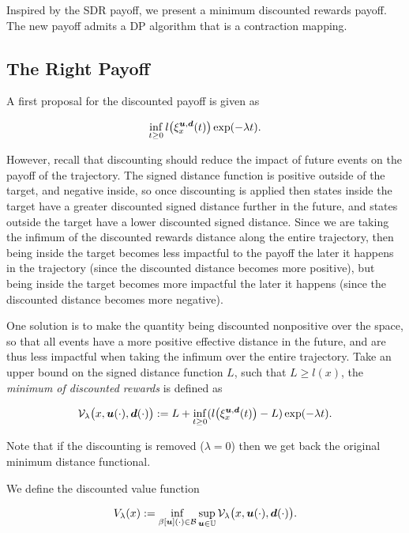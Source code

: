 Inspired by the SDR payoff, we present a minimum discounted rewards payoff. The new payoff admits a DP algorithm that is a contraction mapping.

\subsection{The Right Payoff}

A first proposal for the discounted payoff is given as 
 
\begin{equation}\label{eq:V}
\inf_{t\ge 0}l\big(\xi_{x}^{\bm{u},\bm{d}}(t)\big)\exp(-\lambda  t).
\end{equation}

However, recall that discounting should reduce the impact of future events on the payoff of the trajectory. The signed distance function is positive outside of the target, and negative inside, so once discounting is applied then states inside the target have a greater discounted signed distance further in the future, and states outside the target have a lower discounted signed distance. Since we are taking the infimum of the discounted rewards distance along the entire trajectory, then being inside the target becomes less impactful to the payoff the later it happens in the trajectory (since the discounted distance becomes more positive), but being inside the target becomes more impactful the later it happens (since the discounted distance becomes more negative).

One solution is to make the quantity being discounted nonpositive over the space, so that all events have a more positive effective distance in the future, and are thus less impactful when taking the infimum over the entire trajectory. Take an upper bound on the signed distance function $L$, such that $L\geq l(x)$, the \emph{minimum of discounted rewards} is defined as 

\begin{equation}\label{eq:V_lambda}
\mathcal{V}_{\lambda}\big(x,\bm{u}(\cdot),\bm{d}(\cdot)\big) := L + \inf_{t\ge 0}(l\big(\xi_{x}^{\bm{u},\bm{d}}(t)\big)-L)\exp(-\lambda  t).
\end{equation}

\noindent Note that if the discounting is removed ($\lambda =0$) then we get back the original minimum distance functional. 

We define the {discounted value function} 

\begin{equation}
V_{\lambda}(x):=\inf_{\beta[\bm{u}](\cdot) \in \mathcal{B}} \sup_{\bm{u} \in \mathbb{U}}\mathcal{V}_{\lambda}\big(x,\bm{u}(\cdot),\bm{d}(\cdot)\big).
\end{equation}


